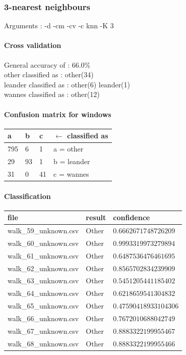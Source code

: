 \subsubsection{3-nearest neighbours}
Arguments : -d -cm -cv -c knn -K 3
\paragraph{Cross validation}
General accuracy of : 66.0\%\\
other classified as : other(34) \\
leander classified as : other(6) leander(1) \\
wannes classified as : other(12)

\paragraph{Confusion matrix for windows}

\begin{tabular}{l l l | l}
    a &    b &   c & $\leftarrow$ classified as \\
    \hline
   795 & 6 & 1 &    a = other \\
    29 &  93 &  1 &    b = leander \\
    31 &   0 &  41 &    c = wannes
\end{tabular}

\paragraph{Classification}
\begin{tabular}{l | l | l}
    file & result & confidence\\ 
    \hline 
    walk\_59\_unknown.csv & Other   & $0.6662671748726209$ \\
    walk\_60\_unknown.csv & Other   & $0.9993319973279894$ \\
    walk\_61\_unknown.csv & Other   & $0.6487536476461695$ \\
    walk\_62\_unknown.csv & Other   & $0.8565702834239909$ \\
    walk\_63\_unknown.csv & Other   & $0.5451205441185402$ \\
    walk\_64\_unknown.csv & Other   & $0.6218659541304832$ \\
    walk\_65\_unknown.csv & Other   & $0.47590418933104306$ \\
    walk\_66\_unknown.csv & Other   & $0.7672010688042749$ \\
    walk\_67\_unknown.csv & Other   & $0.8883322199955467$ \\
    walk\_68\_unknown.csv & Other   & $0.8883322199955466$
\end{tabular}

